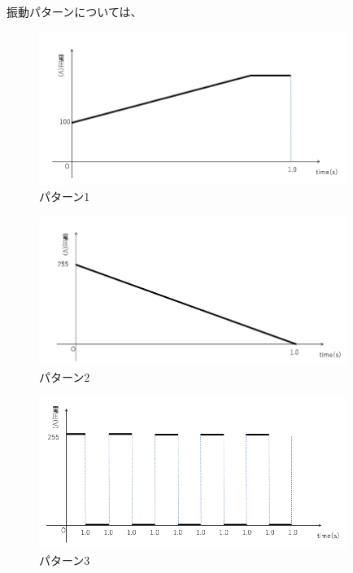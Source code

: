 \newpage

振動パターンについては、

\begin{figure}[h]
\centering
\includegraphics[clip,width=10cm]{./fig/patarn1.png}
\caption{パターン1}\label{patarn1}
\end{figure}

\begin{figure}[h]
\centering
\includegraphics[clip,width=10cm]{./fig/patarn2.png}
\caption{パターン2}\label{patarn2}
\end{figure}

\begin{figure}[h]
\centering
\includegraphics[clip,width=10cm]{./fig/patarn3.png}
\caption{パターン3}\label{patarn3}
\end{figure}

